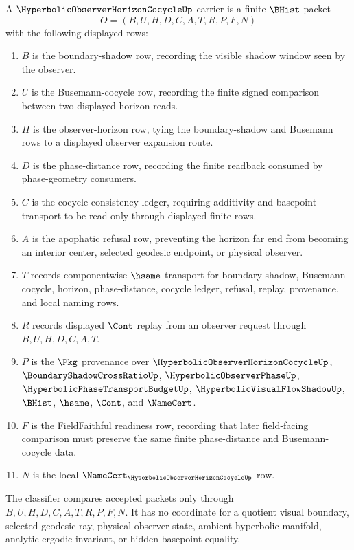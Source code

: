 \begin{definition}
\label{def:hyperbolic-observer-horizon-cocycle-carrier}
A $\HyperbolicObserverHorizonCocycleUp$ carrier is a finite $\BHist$ packet
$$
O=(B,U,H,D,C,A,T,R,P,F,N)
$$
with the following displayed rows:
\begin{enumerate}
\item $B$ is the boundary-shadow row, recording the visible shadow window seen by the observer.
\item $U$ is the Busemann-cocycle row, recording the finite signed comparison between two displayed horizon reads.
\item $H$ is the observer-horizon row, tying the boundary-shadow and Busemann rows to a displayed observer expansion route.
\item $D$ is the phase-distance row, recording the finite readback consumed by phase-geometry consumers.
\item $C$ is the cocycle-consistency ledger, requiring additivity and basepoint transport to be read only through displayed finite rows.
\item $A$ is the apophatic refusal row, preventing the horizon far end from becoming an interior center, selected geodesic endpoint, or physical observer.
\item $T$ records componentwise $\hsame$ transport for boundary-shadow, Busemann-cocycle, horizon, phase-distance, cocycle ledger, refusal, replay, provenance, and local naming rows.
\item $R$ records displayed $\Cont$ replay from an observer request through $B,U,H,D,C,A,T$.
\item $P$ is the $\Pkg$ provenance over $\HyperbolicObserverHorizonCocycleUp$, $\BoundaryShadowCrossRatioUp$, $\HyperbolicObserverPhaseUp$, $\HyperbolicPhaseTransportBudgetUp$, $\HyperbolicVisualFlowShadowUp$, $\BHist$, $\hsame$, $\Cont$, and $\NameCert$.
\item $F$ is the FieldFaithful readiness row, recording that later field-facing comparison must preserve the same finite phase-distance and Busemann-cocycle data.
\item $N$ is the local $\NameCert_{\HyperbolicObserverHorizonCocycleUp}$ row.
\end{enumerate}
The classifier compares accepted packets only through $B,U,H,D,C,A,T,R,P,F,N$. It has no coordinate for a quotient visual boundary, selected geodesic ray, physical observer state, ambient hyperbolic manifold, analytic ergodic invariant, or hidden basepoint equality.
\end{definition}

